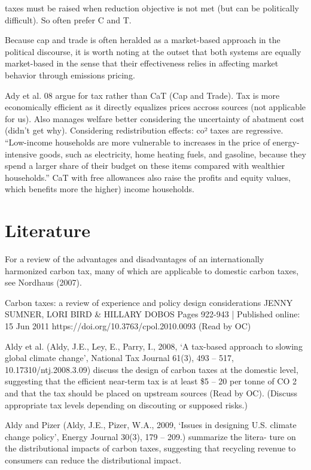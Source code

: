 \documentclass[version=3.21, pagesize, twoside=off, bibliography=totoc, DIV=calc, fontsize=12pt, a4paper, french, english]{scrartcl}
\begin{document}
taxes must be raised when reduction objective is not met (but can be politically difficult). So often prefer C and T.

Because cap and trade is often heralded as a market-based approach in the
political discourse, it is worth noting at the outset that both systems are equally market-based in
the sense that their effectiveness relies in affecting market behavior through emissions pricing.

Ady et al. 08 argue for tax rather than CaT (Cap and Trade). Tax is more economically efficient as it directly equalizes prices accross sources (not applicable for us). Also manages welfare better considering the uncertainty of abatment cost (didn’t get why). Considering redistribution effects: co² taxes are regressive. “Low-income households are more vulnerable to increases in the price of energy-intensive
goods, such as electricity, home heating fuels, and gasoline, because they spend a larger share of
their budget on these items compared with wealthier households.” CaT with free allowances also raise the profits and equity values, which benefits more the higher) income households.

\section{Literature}
For a review of
the advantages and disadvantages of an internationally harmonized carbon tax, many of which are
applicable to domestic carbon taxes, see Nordhaus (2007).

Carbon taxes: a review of experience and policy design considerations JENNY SUMNER, LORI BIRD \& HILLARY DOBOS Pages 922-943 | Published online: 15 Jun 2011 https://doi.org/10.3763/cpol.2010.0093 (Read by OC)

Aldy et al. (Aldy, J.E., Ley, E., Parry, I., 2008, ‘A tax-based approach to slowing global climate change’, National Tax Journal 61(3),
493 – 517, 10.17310/ntj.2008.3.09) discuss the design of carbon taxes
at the domestic level, suggesting that the efficient near-term tax is at least \$5 – 20 per tonne of CO 2 and
that the tax should be placed on upstream sources (Read by OC). (Discuss appropriate tax levels depending on discouting or supposed risks.)
 
Aldy and Pizer (Aldy, J.E., Pizer, W.A., 2009, ‘Issues in designing U.S. climate change policy’, Energy Journal 30(3), 179 – 209.) summarize the litera-
ture on the distributional impacts of carbon taxes, suggesting that recycling revenue to consumers can
reduce the distributional impact.
\end{document}
